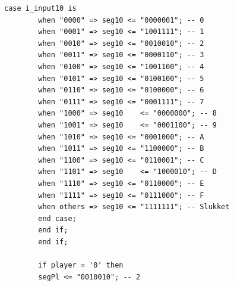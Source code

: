 \begin{enumerate}
\begin{lstlisting}[caption={Behavioral style kode for Guessgame},label={lst:Guessgame2pl}]
		case i_input10 is
		when "0000" => seg10 <= "0000001"; -- 0
		when "0001" => seg10 <= "1001111"; -- 1
		when "0010" => seg10 <= "0010010"; -- 2
		when "0011" => seg10 <= "0000110"; -- 3
		when "0100" => seg10 <= "1001100"; -- 4
		when "0101" => seg10 <= "0100100"; -- 5
		when "0110" => seg10 <= "0100000"; -- 6
		when "0111" => seg10 <= "0001111"; -- 7
		when "1000" => seg10	<= "0000000"; -- 8
		when "1001" => seg10	<= "0001100"; -- 9
		when "1010" => seg10 <= "0001000"; -- A
		when "1011" => seg10 <= "1100000"; -- B
		when "1100" => seg10 <= "0110001"; -- C
		when "1101" => seg10	<= "1000010"; -- D
		when "1110" => seg10 <= "0110000"; -- E
		when "1111" => seg10 <= "0111000"; -- F
		when others => seg10 <= "1111111"; -- Slukket
		end case;
		end if;
		end if;
		
		if player = '0' then
		segPl <= "0010010"; -- 2
		

\end{lstlisting}
\end{enumerate}
